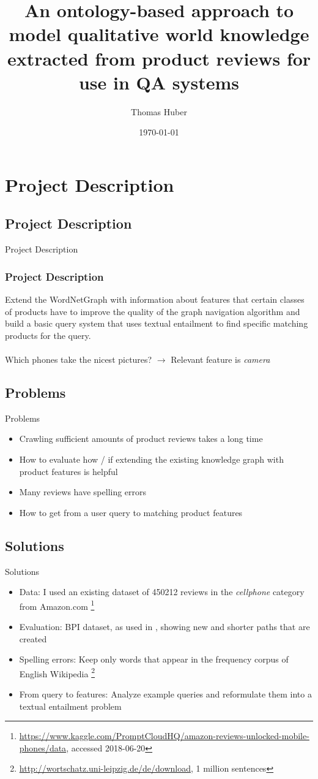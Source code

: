 \documentclass{beamer}
\title[Text Entailment Seminar] %
{An ontology-based approach to model qualitative world knowledge extracted from product reviews for use in QA systems}
\author[]{\Large Thomas Huber\texorpdfstring{\\ \small \vspace{1cm} \color{black}}{ }}
\date[\today] %
{\today}
\begin{document}
\frame{\titlepage}

\section{Project Description}
\subsection{Project Description}
\begin{frame}{Project Description}
\frametitle{Project Description}
Extend the WordNetGraph \cite{silva2018recognizing} with information about features that certain classes of products have to improve the quality of the graph navigation algorithm and build a basic query system that uses textual entailment to find specific matching products for the query.\\
\\
Which phones take the nicest pictures? $\rightarrow$ Relevant feature is \textit{camera}
\end{frame}

\subsection{Problems}
\begin{frame}{Problems}
    \begin{itemize}
        \item Crawling sufficient amounts of product reviews takes a long time
        \item How to evaluate how / if extending the existing knowledge graph with product features is helpful
        \item Many reviews have spelling errors
        \item How to get from a user query to matching product features
    \end{itemize}
\end{frame}

\subsection{Solutions}
\begin{frame}{Solutions}
    \begin{itemize}
        \item Data: I used an existing dataset of 450212 reviews in the \textit{cellphone} category from Amazon.com \footnote{\url{https://www.kaggle.com/PromptCloudHQ/amazon-reviews-unlocked-mobile-phones/data}, accessed 2018-06-20}
        \item Evaluation: BPI dataset, as used in \cite{silva2018recognizing}, showing new and shorter paths that are created
        \item Spelling errors: Keep only words that appear in the frequency corpus of English Wikipedia \footnote{\url{http://wortschatz.uni-leipzig.de/de/download}, 1 million sentences}
        \item From query to features: Analyze example queries and reformulate them into a textual entailment problem
    \end{itemize}
\end{frame}
\end{document}
